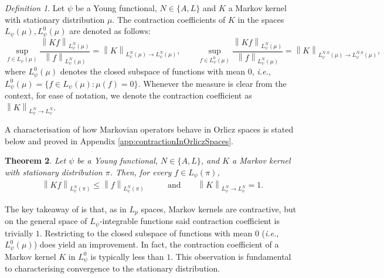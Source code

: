 \documentclass[11pt]{article}
\theoremstyle{plain}
\newtheorem{theorem}{Theorem}[section]
\theoremstyle{remark}
\newtheorem{definition}[theorem]{Definition}
\begin{document}
    \begin{definition}\label{def:contractionCoefficients}
        Let $\psi$ be a Young functional, $N\in\{A,L\}$ and $K$ a Markov kernel with stationary distribution $\mu$. The contraction coefficients of $K$ in the spaces $L_\psi(\mu), L_\psi^0(\mu)$ are denoted as follows:
    \begin{equation}
            \sup_{f\in L_\psi(\mu)} \frac{\left\lVert Kf \right\rVert_{L_\psi^N(\mu)}}{\left\lVert f \right\rVert_{L_\psi^N(\mu)}} = \left\lVert K \right\rVert_{L_\psi^N(\mu)\to L_\psi^N(\mu)},\qquad \sup_{f\in L_\psi^0(\mu)} \frac{\left\lVert Kf \right\rVert_{L_\psi^N(\mu)}}{\left\lVert f \right\rVert_{L_\psi^N(\mu)}} = \left\lVert K \right\rVert_{L_\psi^{N,0}(\mu)\to L_\psi^{N,0}(\mu)},
        \end{equation}
        where $L_\psi^0(\mu)$ denotes the closed subspace of functions with mean $0$, \textit{i.e.}, $L_\psi^0(\mu)= \{f \in L_\psi(\mu): \mu(f)=0\}$. Whenever the %
        measure is clear from the context, for ease of notation, we denote the contraction coefficient as $\left\lVert K \right\rVert_{L_\psi^N\to L_\psi^N}$. %
    \end{definition}
A %
characterisation of how 
Markovian operators behave 
in Orlicz spaces is stated below and proved in Appendix \ref{app:contractionInOrliczSpaces}. %
    \begin{theorem}\label{thm:contractionInOrliczSpaces}
        Let $\psi$ be a Young functional, $N\in \{A,L\}$, and $K$ a Markov kernel with stationary distribution $\pi$. Then, for every $f\in L_\psi(\pi)$, %
    \begin{align}
            \left\lVert K f\right\rVert_{L^N_\psi(\pi)} \leq 
            \left\lVert f\right\rVert_{L^N_\psi(\pi)}\hspace{2em}&\text{and}\hspace{2em} \left\lVert K \right\rVert_{L^N_\psi \to L^N_\psi} =1.
        \end{align}
    \end{theorem}
    

   The key takeaway of  is that, %
    as in $L_p$ spaces, Markov kernels are contractive, but on the general space of $L_\psi$-integrable functions said contraction coefficient is trivially $1$. Restricting %
    to the closed subspace of functions with mean $0$ (\textit{i.e.}, $L^0_\psi(\mu)$) does yield an improvement. In fact, %
    the contraction coefficient of a Markov kernel $K$ in %
    $L_\psi^0$ is typically less than $1$. This observation is fundamental to characterising convergence to the stationary distribution. 
    
\end{document}

